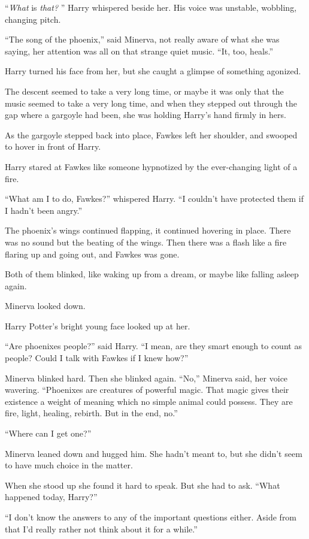 ``\emph{What} is \emph{that?} '' Harry whispered beside her. His voice was
unstable, wobbling, changing pitch.

``The song of the phoenix,'' said Minerva, not really aware of what she
was saying, her attention was all on that strange quiet music. ``It,
too, heals.''

Harry turned his face from her, but she caught a glimpse of something
agonized.

The descent seemed to take a very long time, or maybe it was only that
the music seemed to take a very long time, and when they stepped out
through the gap where a gargoyle had been, she was holding Harry's hand
firmly in hers.

As the gargoyle stepped back into place, Fawkes left her shoulder, and
swooped to hover in front of Harry.

Harry stared at Fawkes like someone hypnotized by the ever-changing
light of a fire.

``What am I to do, Fawkes?'' whispered Harry. ``I couldn't have
protected them if I hadn't been angry.''

The phoenix's wings continued flapping, it continued hovering in place.
There was no sound but the beating of the wings. Then there was a flash
like a fire flaring up and going out, and Fawkes was gone.

Both of them blinked, like waking up from a dream, or maybe like falling
asleep again.

Minerva looked down.

Harry Potter's bright young face looked up at her.

``Are phoenixes people?'' said Harry. ``I mean, are they smart enough to
count as people? Could I talk with Fawkes if I knew how?''

Minerva blinked hard. Then she blinked again. ``No,'' Minerva said, her
voice wavering. ``Phoenixes are creatures of powerful magic. That magic
gives their existence a weight of meaning which no simple animal could
possess. They are fire, light, healing, rebirth. But in the end, no.''

``Where can I get one?''

Minerva leaned down and hugged him. She hadn't meant to, but she didn't
seem to have much choice in the matter.

When she stood up she found it hard to speak. But she had to ask. ``What
happened today, Harry?''

``I don't know the answers to any of the important questions either.
Aside from that I'd really rather not think about it for a while.''

